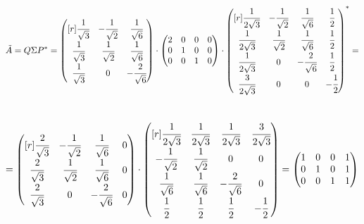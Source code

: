 \documentclass[12pt]{article}
\theoremstyle{definition}
\numberwithin{equation}{section}
\begin{document}
	\[\tilde{A} = Q \Sigma P^* = \begin{pmatrix}[r]
	\cfrac{1}{\sqrt{3}} & -\cfrac{1}{\sqrt{2}} & \cfrac{1}{\sqrt{6}}\\ \cfrac{1}{\sqrt{3}} & \cfrac{1}{\sqrt{2}} & \cfrac{1}{\sqrt{6}}\\ \cfrac{1}{\sqrt{3}} & 0 & -\cfrac{2}{\sqrt{6}}\\ 
	\end{pmatrix} \cdot \begin{pmatrix}
	2 & 0 & 0 & 0\\         
	0 & 1 & 0 & 0\\
	0 & 0 & 1 & 0\\
	\end{pmatrix} \cdot \begin{pmatrix}[r]
	\cfrac{1}{2\sqrt{3}} & -\cfrac{1}{\sqrt{2}} & \cfrac{1}{\sqrt{6}} & \cfrac{1}{2}\\ 
	\cfrac{1}{2\sqrt{3}} & \cfrac{1}{\sqrt{2}} & \cfrac{1}{\sqrt{6}} & \cfrac{1}{2}\\ 
	\cfrac{1}{2\sqrt{3}} & 0 & -\cfrac{2}{\sqrt{6}} & \cfrac{1}{2}\\
	\cfrac{3}{2\sqrt{3}} & 0 & 0 & -\cfrac{1}{2}\\
	\end{pmatrix}^*=\]\\ \[= \begin{pmatrix}[r]
	\cfrac{2}{\sqrt{3}} & -\cfrac{1}{\sqrt{2}} & \cfrac{1}{\sqrt{6}} & 0\\ 
	\cfrac{2}{\sqrt{3}} & \cfrac{1}{\sqrt{2}} & \cfrac{1}{\sqrt{6}} & 0\\ 
	\cfrac{2}{\sqrt{3}} & 0 & -\cfrac{2}{\sqrt{6}} & 0\\
	\end{pmatrix} \cdot \begin{pmatrix}[r]
	\cfrac{1}{2\sqrt{3}} & \cfrac{1}{2\sqrt{3}} & \cfrac{1}{2\sqrt{3}} & \cfrac{3}{2\sqrt{3}}\\ 
	-\cfrac{1}{\sqrt{2}} & \cfrac{1}{\sqrt{2}} & 0 & 0\\ 
	\cfrac{1}{\sqrt{6}} & \cfrac{1}{\sqrt{6}} & -\cfrac{2}{\sqrt{6}} & 0\\
	\cfrac{1}{2} & \cfrac{1}{2} & \cfrac{1}{2} & -\cfrac{1}{2}\\
	\end{pmatrix} = \begin{pmatrix}
	1 & 0 & 0 & 1\\         
	0 & 1 & 0 & 1\\
	0 & 0 & 1 & 1\\
	\end{pmatrix}\]
\end{document}
